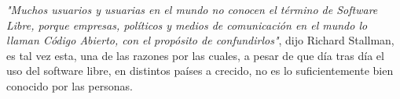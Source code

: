 \textit{"Muchos usuarios y usuarias en el mundo no conocen el término de Software Libre, porque empresas, políticos y medios de comunicación en el mundo lo llaman Código 
Abierto, con el propósito de confundirlos"}, dijo Richard Stallman, es tal vez esta, una de las razones por las cuales, a pesar de que día tras día el uso del software libre, en 
distintos países a crecido, no es lo suficientemente bien conocido por las personas.
